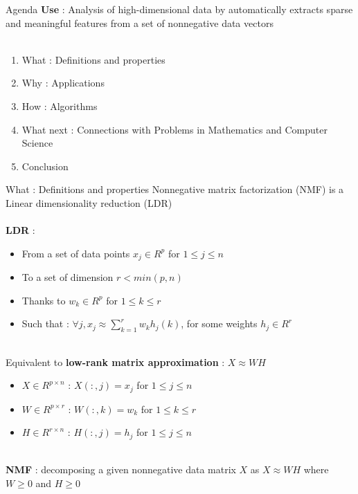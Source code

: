\begin{frame}{Agenda}
    \textbf{Use} : Analysis of high-dimensional data by automatically extracts sparse and meaningful features from a set of nonnegative data vectors\\
    ~\\
    \begin{enumerate}
        \item What : Definitions and properties
        \item Why : Applications
        \item How : Algorithms
        \item What next : Connections with Problems in Mathematics and Computer Science
        \item Conclusion
    \end{enumerate}
\end{frame}

\begin{frame}{What : Definitions and properties}
     Nonnegative matrix factorization (NMF) is a Linear dimensionality reduction (LDR) \\
         ~\\
     \textbf{LDR} : \\
     \begin{itemize}
         \item From a set of data points $x_j \in R^{p}$ for $1 \leq j \leq n$ 
         \item To a set of dimension $r < min(p,n)$
         \item Thanks to $w_k \in R^p$ for $1 \leq k \leq r$
         \item Such that : $\forall j, x_j \approx \sum_{k = 1}^{r} w_{k} h_{j}(k)$, for some weights $h_j\in R^r$
     \end{itemize}
              ~\\
     Equivalent to \textbf{low-rank matrix approximation} : $X \approx W H$\\
     \begin{itemize}
     \item $X \in R^{p \times n}$ : $X(:,j) = x_j$ for $1 \leq j \leq n$ %
     \item $W \in R^{p \times r}$ : $W(:,k) = w_k$ for $1 \leq k \leq r$ %
     \item $H \in R^{r \times n}$ : $H(:,j) = h_j$ for $1 \leq j \leq n$ %
     \end{itemize}
 ~\\
     \textbf{NMF} : decomposing a given nonnegative data matrix $X$ as $X \approx W H$ where $W \geq 0$ and $H \geq 0$ \\ %
\end{frame}
